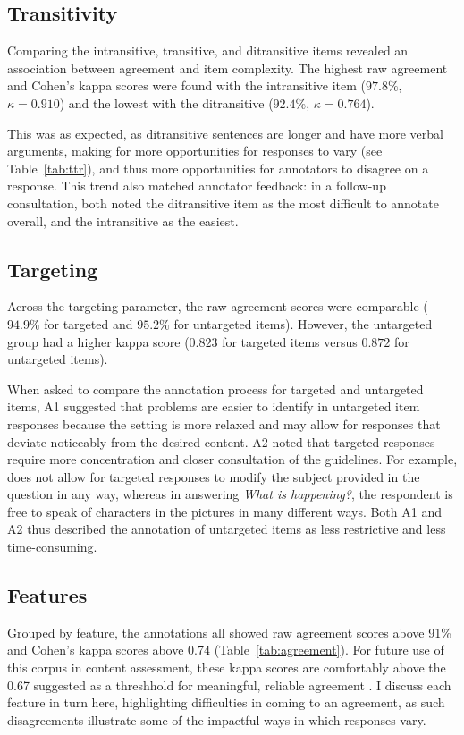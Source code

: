 \subsection{Transitivity} 
\label{sec:transitivity}
Comparing the intransitive, transitive, and ditransitive items revealed an association between agreement and item complexity. The highest raw agreement and Cohen's kappa scores were found with the intransitive item ($97.8\%$, $\kappa=0.910$) and the lowest with the ditransitive ($92.4\%$, $\kappa=0.764$). 

This was as expected, as ditransitive sentences are longer and have more verbal arguments, making for more opportunities for responses to vary (see Table~\ref{tab:ttr}), and thus more opportunities for annotators to disagree on a response. This trend also matched annotator feedback: in a follow-up consultation, both noted the ditransitive item as the most difficult to annotate overall, and the intransitive as the easiest.

\subsection{Targeting} 
\label{sec:prompts}
Across the targeting parameter, the raw agreement scores were comparable ($94.9\%$ for targeted and $95.2\%$ for untargeted items). However, the untargeted group had a higher kappa score ($0.823$ for targeted items versus $0.872$ for untargeted items).

When asked to compare the annotation process for targeted and untargeted items, A1 suggested that problems are easier to identify in untargeted item responses because the setting is more relaxed and may allow for responses that deviate noticeably from the desired content. A2 noted that targeted responses require more concentration and closer consultation of the guidelines. For example,  does not allow for targeted responses to modify the subject provided in the question in any way, whereas in answering \textit{What is happening?}, the respondent is free to speak of characters in the pictures in many different ways.  Both A1 and A2 thus described the annotation of untargeted items as less restrictive and less time-consuming.

\subsection{Features} 
\label{sec:features}
Grouped by feature, the annotations all showed raw agreement scores above 91\% and Cohen's kappa scores above 0.74 (Table~\ref{tab:agreement}). For future use of this corpus in content assessment, these kappa scores are comfortably above the 0.67 suggested as a threshhold for meaningful, reliable agreement \citep{landis1977measurement, artstein:massimo:2008}.  I discuss each feature in turn here, highlighting difficulties in coming to an agreement, as such disagreements illustrate some of the impactful ways in which responses vary.

